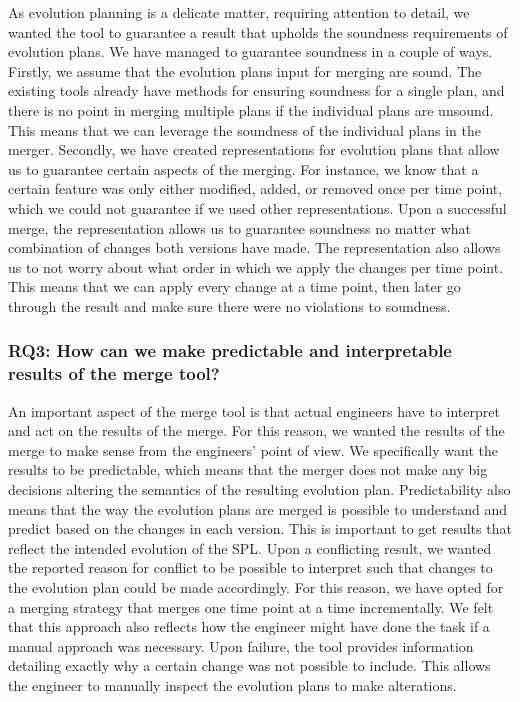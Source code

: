 \documentclass[a4paper,english]{ifimaster}
\begin{document}
As evolution planning is a delicate matter, requiring attention to detail, we wanted the tool to guarantee a result that upholds the soundness requirements of evolution plans. We have managed to guarantee soundness in a couple of ways. Firstly, we assume that the evolution plans input for merging are sound. The existing tools already have methods for ensuring soundness for a single plan, and there is no point in merging multiple plans if the individual plans are unsound. This means that we can leverage the soundness of the individual plans in the merger. Secondly, we have created representations for evolution plans that allow us to guarantee certain aspects of the merging. For instance, we know that a certain feature was only either modified, added, or removed once per time point, which we could not guarantee if we used other representations. Upon a successful merge, the representation allows us to guarantee soundness no matter what combination of changes both versions have made. The representation also allows us to not worry about what order in which we apply the changes per time point. This means that we can apply every change at a time point, then later go through the result and make sure there were no violations to soundness.

\subsubsection{RQ3: How can we make predictable and interpretable results of the merge tool?}

An important aspect of the merge tool is that actual engineers have to interpret and act on the results of the merge. For this reason, we wanted the results of the merge to make sense from the engineers' point of view. We specifically want the results to be predictable, which means that the merger does not make any big decisions altering the semantics of the resulting evolution plan. Predictability also means that the way the evolution plans are merged is possible to understand and predict based on the changes in each version. This is important to get results that reflect the intended evolution of the SPL. Upon a conflicting result, we wanted the reported reason for conflict to be possible to interpret such that changes to the evolution plan could be made accordingly. For this reason, we have opted for a merging strategy that merges one time point at a time incrementally. We felt that this approach also reflects how the engineer might have done the task if a manual approach was necessary. Upon failure, the tool provides information detailing exactly why a certain change was not possible to include. This allows the engineer to manually inspect the evolution plans to make alterations.
\end{document}
